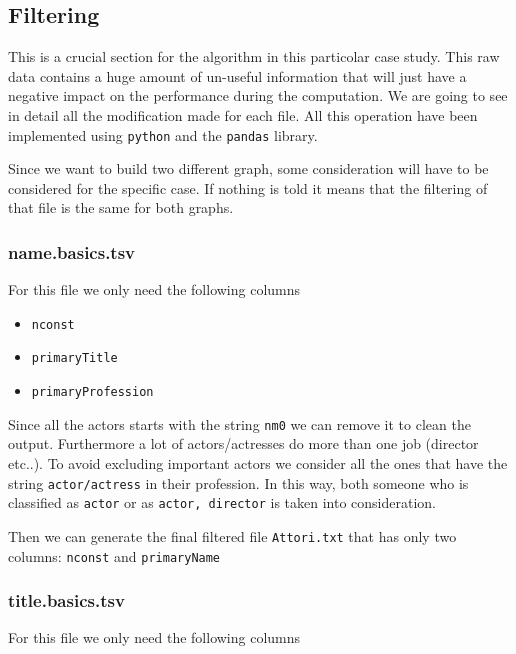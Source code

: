 \newpage
\subsection{Filtering}

This is a crucial section for the algorithm in this particolar case study. This raw data contains a huge amount of un-useful information that will just have a negative impact on the performance during the computation. We are going to see in detail all the modification made for each file. All this operation have been implemented using \texttt{python} and the \texttt{pandas} library. \s

Since we want to build two different graph, some consideration will have to be considered for the specific case. If nothing is told it means that the filtering of that file is the same for both graphs.

\subsubsection{name.basics.tsv}

For this file we only need the following columns

\begin{itemize}
    \item \texttt{nconst}
    \item \texttt{primaryTitle}
    \item \texttt{primaryProfession}
\end{itemize}
Since all the actors starts with the string \texttt{nm0} we can remove it to clean the output. Furthermore a lot of actors/actresses do more than one job (director etc..). To avoid excluding important actors we consider all the ones that have the string \texttt{actor/actress} in their profession. In this way, both someone who is classified as \texttt{actor} or as \texttt{actor, director} is taken into consideration. \s

\noindent Then we can generate the final filtered file \texttt{Attori.txt} that has only two columns: \texttt{nconst} and \texttt{primaryName}


\subsubsection{title.basics.tsv}

For this file we only need the following columns

